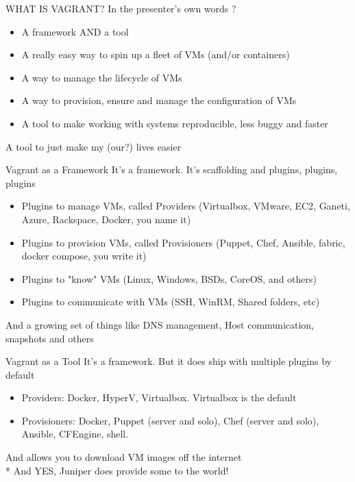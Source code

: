\documentclass{beamer}
\begin{document}
    \begin{frame}{WHAT IS VAGRANT?}
        In the presenter's own words ?
        \begin{itemize}
        \pause \item A framework AND a tool
        \pause \item A really easy way to spin up a fleet of VMs (and/or containers)
        \pause \item A way to manage the lifecycle of VMs
        \pause \item A way to provision, ensure and manage the configuration of VMs
        \pause \item A tool to make working with systems reproducible, less buggy and faster
        \end{itemize}
    A tool to just make my (our?) lives easier
    \end{frame}

    \begin{frame}{Vagrant as a Framework}
        It's a framework. It's scaffolding and plugins, plugins, plugins
        \begin{itemize}
        \pause \item Plugins to manage VMs, called Providers (Virtualbox, VMware, EC2, Ganeti, Azure, Rackspace, Docker, you name it)
        \pause \item Plugins to provision VMs, called Provisioners (Puppet, Chef, Ansible, fabric, docker compose, you write it)
        \pause \item Plugins to "know" VMs (Linux, Windows, BSDs, CoreOS, and others)
        \pause \item Plugins to communicate with VMs (SSH, WinRM, Shared folders, etc)
        \end{itemize}
    And a growing set of things like DNS management, Host communication, snapshots and others
    \end{frame}

    \begin{frame}{Vagrant as a Tool}
        It's a framework. But it does ship with multiple plugins by default
        \begin{itemize}
        \pause \item Providers: Docker, HyperV, Virtualbox. Virtualbox is the default
        \pause \item Provisioners: Docker, Puppet (server and solo), Chef (server and solo), Ansible, CFEngine, shell.
        \end{itemize}
    \pause And allows you to download VM images off the internet
    \pause \\* And YES, Juniper does provide some to the world!
    \end{frame}
\end{document}
